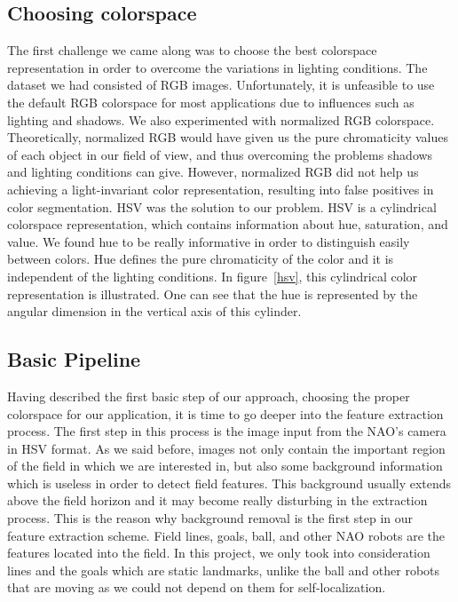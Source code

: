 \documentclass[	DIV=calc,%
							paper=a4,%
							fontsize=9pt,%
							twocolumn]{scrartcl}	 					%
\begin{document}
\subsection{Choosing colorspace}
The first challenge we came along was to choose the best colorspace representation in order to overcome the variations in lighting conditions. The dataset we had consisted of RGB images. Unfortunately, it is unfeasible to use the default RGB colorspace for most applications due to influences such as lighting and shadows. We also experimented with normalized RGB colorspace. Theoretically,  normalized RGB would have given us the pure chromaticity values of each object in our field of view, and thus overcoming the problems shadows and lighting conditions can give. However, normalized RGB did not help us achieving a light-invariant color representation, resulting into false positives in color segmentation. HSV was the solution to our problem. HSV is a cylindrical colorspace representation, which contains information about hue, saturation, and value. We found hue to be really informative in order to distinguish easily between colors. Hue defines the pure chromaticity of the color and it is independent of the lighting conditions. In figure~\ref{hsv}, this cylindrical color representation is illustrated. One can see that the hue is represented by the angular dimension in the vertical axis of this cylinder. 


\subsection{Basic Pipeline}
Having described the first basic step of our approach, choosing the proper colorspace for our application, it is time to go deeper into the feature extraction process.
The first step in this process is the image input from the NAO's camera in HSV format. As we said before, images not only contain the important region of the field in which we are interested in, but also some background information which is useless in order to detect field features. This background usually extends above the field horizon and it may become really disturbing in the extraction process. This is the reason why background removal is the first step in our feature extraction scheme. Field lines, goals, ball, and other NAO robots are the features located into the field. In this project, we only took into consideration lines and the goals which are static landmarks, unlike the ball and other robots that are moving as we could not depend on them for self-localization. 
\end{document}

